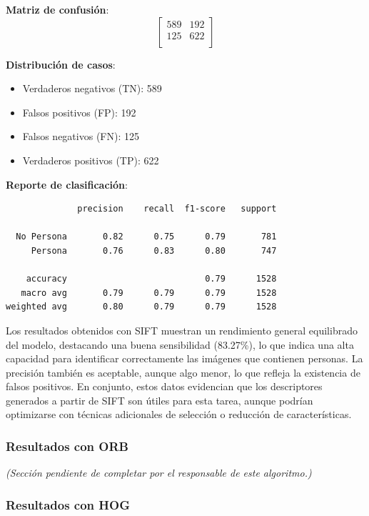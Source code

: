 \documentclass[a4paper]{article}
\begin{document}
\textbf{Matriz de confusión}:
\[
\begin{bmatrix}
589 & 192 \\
125 & 622 \\
\end{bmatrix}
\]

\textbf{Distribución de casos}:
\begin{itemize}
    \item Verdaderos negativos (TN): 589
    \item Falsos positivos (FP): 192
    \item Falsos negativos (FN): 125
    \item Verdaderos positivos (TP): 622
\end{itemize}

\textbf{Reporte de clasificación}:

\begin{verbatim}
              precision    recall  f1-score   support

  No Persona       0.82      0.75      0.79       781
     Persona       0.76      0.83      0.80       747

    accuracy                           0.79      1528
   macro avg       0.79      0.79      0.79      1528
weighted avg       0.80      0.79      0.79      1528
\end{verbatim}

Los resultados obtenidos con SIFT muestran un rendimiento general equilibrado del modelo, destacando una buena sensibilidad (83.27\%), lo que indica una alta capacidad para identificar correctamente las imágenes que contienen personas. La precisión también es aceptable, aunque algo menor, lo que refleja la existencia de falsos positivos. En conjunto, estos datos evidencian que los descriptores generados a partir de SIFT son útiles para esta tarea, aunque podrían optimizarse con técnicas adicionales de selección o reducción de características.

\vspace{0.5cm}
\subsubsection*{Resultados con ORB}

\textit{(Sección pendiente de completar por el responsable de este algoritmo.)}

\vspace{0.5cm}
\subsubsection*{Resultados con HOG}
\end{document}
